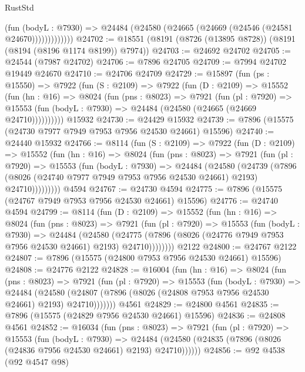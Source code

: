 \begin{lexlean}{RustStd}
\begin{coremodule}
                  (fun (bodyL : @7930) =>
                  @24484 (@24580 (@24665 (@24669 (@24546 (@24581 @24670)))))))))))))
@24702 := @18551 (@8191 (@8726 (@13895 @8728)) (@8191 (@8194 (@8196 @1174 @8199)) @7974))
@24703 := @24692 @24702
@24705 := @24544 (@7987 @24702)
@24706 := @7896 @24705
@24709 := @7994 @24702 @19449 @24670
@24710 := @24706 @24709
@24729 := @15897
    (fun (ps : @15550) =>
    @7922
      (fun (S : @2109) =>
      @7922
        (fun (D : @2109) =>
        @15552
          (fun (hn : @16) =>
          @8024
            (fun (pns : @8023) =>
            @7921
              (fun (pl : @7920) =>
              @15553 (fun (bodyL : @7930) => @24484 (@24580 (@24665 (@24669 @24710))))))))))
    @15932
@24730 := @24429 @15932
@24739 := @7896 (@15575 (@24730 @7977 @7949 @7953 @7956 @24530 @24661) @15596)
@24740 := @24440 @15932
@24766 := @8114
    (fun (S : @2109) =>
    @7922
      (fun (D : @2109) =>
      @15552
        (fun (hn : @16) =>
        @8024
          (fun (pns : @8023) =>
          @7921
            (fun (pl : @7920) =>
            @15553
              (fun (bodyL : @7930) =>
              @24484
                (@24580
                  (@24739
                    (@7896
                      (@8026 (@24740 @7977 @7949 @7953 @7956 @24530 @24661) @2193)
                      @24710)))))))))
    @4594
@24767 := @24730 @4594
@24775 := @7896 (@15575 (@24767 @7949 @7953 @7956 @24530 @24661) @15596)
@24776 := @24740 @4594
@24799 := @8114
    (fun (D : @2109) =>
    @15552
      (fun (hn : @16) =>
      @8024
        (fun (pns : @8023) =>
        @7921
          (fun (pl : @7920) =>
          @15553
            (fun (bodyL : @7930) =>
            @24484
              (@24580
                (@24775 (@7896 (@8026 (@24776 @7949 @7953 @7956 @24530 @24661) @2193) @24710))))))))
    @2122
@24800 := @24767 @2122
@24807 := @7896 (@15575 (@24800 @7953 @7956 @24530 @24661) @15596)
@24808 := @24776 @2122
@24828 := @16004
    (fun (hn : @16) =>
    @8024
      (fun (pns : @8023) =>
      @7921
        (fun (pl : @7920) =>
        @15553
          (fun (bodyL : @7930) =>
          @24484
            (@24580 (@24807 (@7896 (@8026 (@24808 @7953 @7956 @24530 @24661) @2193) @24710)))))))
    @4561
@24829 := @24800 @4561
@24835 := @7896 (@15575 (@24829 @7956 @24530 @24661) @15596)
@24836 := @24808 @4561
@24852 := @16034
    (fun (pns : @8023) =>
    @7921
      (fun (pl : @7920) =>
      @15553
        (fun (bodyL : @7930) =>
        @24484 (@24580 (@24835 (@7896 (@8026 (@24836 @7956 @24530 @24661) @2193) @24710))))))
@24856 := @92 @4538 (@92 @4547 @98)

\end{coremodule}
\end{lexlean}
